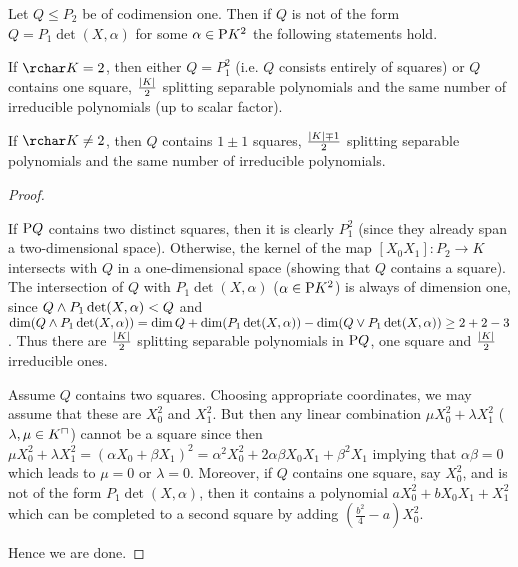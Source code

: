 \begin{lemma}
    Let $Q\leq P_2$ be of codimension one. Then if $Q$ is not of the form $Q=P_1\det(X,\alpha)$ for some $\alpha\in\P K^2$ the following statements hold.
    \begin{statements}
            \item If $\rchar K = 2$, then either $Q=P_1^2$ (i.e. $Q$ consists entirely of squares) or $Q$ contains one square, $\frac{\left\vert{K}\right\vert} 2$ splitting separable polynomials and the same number of irreducible polynomials (up to scalar factor).
        \item If $\rchar K \neq 2$, then $Q$ contains $1\pm 1$ squares, $\frac{\left\vert{K}\right\vert \mp 1} 2$ splitting separable polynomials and the same number of irreducible polynomials.
    \end{statements}
\end{lemma}

\begin{proof}
    \begin{statements}
            \item If $\P Q$ contains two distinct squares, then it is clearly $P_1^2$ (since they already span a two-dimensional space). Otherwise, the kernel of the map $[X_0X_1]:P_2\to K$ intersects with $Q$ in a one-dimensional space (showing that $Q$ contains a square). The intersection of $Q$ with $P_1\det(X,\alpha)$ ($\alpha\in \P K^2$) is always of dimension one, since $Q\wedge P_1\det(X,\alpha)<Q$ and $\dim (Q\wedge P_1\det(X,\alpha))= \dim Q+\dim (P_1\det(X,\alpha))-\dim (Q\vee P_1\det(X,\alpha))\geq 2+2-3$. Thus there are $\frac{\left\vert{K}\right\vert} 2$ splitting separable polynomials in $\P Q$, one square and $\frac{\left\vert{K}\right\vert} 2$ irreducible ones.
            \item Assume $Q$ contains two squares. Choosing appropriate coordinates, we may assume that these are $X_0^2$ and $X_1^2$. But then any linear combination $\mu X_0^2+\lambda X_1^2$ ($\lambda,\mu\in\units K$) cannot be a square since then $\mu X_0^2+\lambda X_1^2={(\alpha X_0 +\beta X_1)}^2=\alpha^2 X_0^2+2\alpha\beta X_0X_1 + \beta^2X_1$ implying that $\alpha\beta=0$ which leads to $\mu=0$ or $\lambda=0$.
        Moreover, if $Q$ contains one square, say $X_0^2$, and is not of the form $P_1\det(X,\alpha)$, then it contains a polynomial $aX_0^2+bX_0X_1+X_1^2$ which can be completed to a second square by adding $\left(\frac{b^2} 4 -a\right)X_0^2$.
    \end{statements}
    Hence we are done.
\end{proof}

